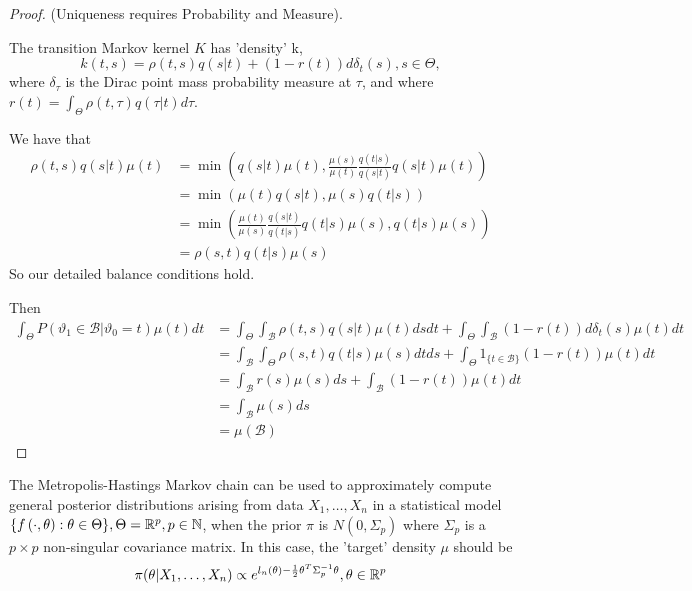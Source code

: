 \documentclass[a4paper]{article}
\begin{document}
 \begin{proof}
	 (Uniqueness requires Probability and Measure).

	 The transition Markov kernel $K$ has 'density' k,
	 \[
		 k(t,s) = \rho(t,s)q(s|t) + (1-r(t))d\delta_{t}(s), s \in \Theta
	 ,\]
	 where $\delta_{\tau}$ is the Dirac point mass probability measure at $\tau$, and where $r(t) = \int_{\Theta} \rho(t, \tau)q(\tau|t) d\tau$.

	 We have that
	 \begin{align*}
		 \rho(t,s)q(s|t)\mu(t) &= \min\left( q(s|t)\mu(t), \frac{\mu(s)}{\mu(t)} \frac{q(t|s)}{q(s|t)} q(s|t)\mu(t) \right)  \\
		 &= \min\left( \mu(t)q(s|t), \mu(s) q(t|s) \right)  \\
		 &= \min\left( \frac{\mu(t)}{\mu(s)} \frac{q(s|t)}{q(t|s)} q(t|s)\mu(s), q(t|s)\mu(s) \right)  \\ 
		 &= \rho(s,t)q(t|s)\mu(s)
	 \end{align*}
	So our detailed balance conditions hold.

	Then
	\begin{align*}
		\int_{\Theta} P\left( \vartheta_1 \in \mathcal{B} | \vartheta_0 =t \right) \mu(t) dt &= \int_{\Theta}\int_{\mathcal{B}} \rho(t,s)q(s|t)\mu(t) dsdt + \int_{\Theta}\int_{\mathcal{B}} (1-r(t))d\delta_{t}(s)\mu(t)dt \\
		&= \int_{\mathcal{B}}\int_{\Theta} \rho(s,t)q(t|s)\mu(s) dt ds + \int_{\Theta} 1_{\{t\in \mathcal{B}\} } (1-r(t))\mu(t) dt \\
		&= \int_{\mathcal{B}} r(s) \mu(s) ds + \int_{\mathcal{B}} (1-r(t)) \mu(t) dt \\
		&= \int_{\mathcal{B}} \mu(s) ds \\
		&= \mu(\mathcal{B})
	\end{align*}
\end{proof}

The Metropolis-Hastings Markov chain can be used to approximately compute general posterior distributions arising from data $X_1, \ldots, X_n$ in a statistical model $\{f\left( \cdot , \theta \right) : \theta \in \Theta \}, \Theta = \mathbb{R}^{p}, p \in \mathbb{N}$, when the prior $\pi$ is $N(0, \Sigma_p)$ where $\Sigma_p$ is a $p\times p$ non-singular covariance matrix. In this case, the 'target' density $\mu$ should be
\[
	\pi(\theta|X_1,\ldots,X_n) \propto e^{l_n(\theta) - \frac{1}{2} \theta^{T}\Sigma_p^{-1} \theta}, \theta \in \mathbb{R}^{p}
\] 
\end{document}
